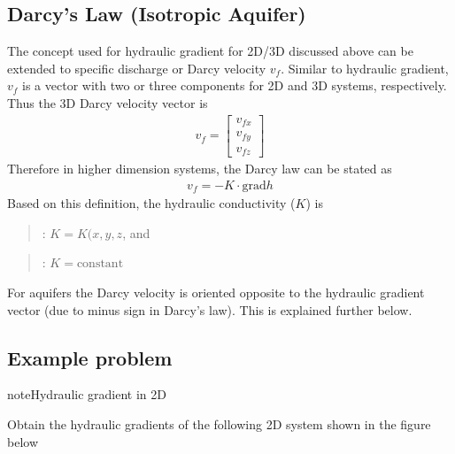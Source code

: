 \documentclass[letterpaper,10pt,english]{jupyterBook}
\begin{document}
\subsection{Darcy’s Law (Isotropic Aquifer)}
\label{\detokenize{content/flow/L6/16_darcy_law_3D:darcy-s-law-isotropic-aquifer}}
\sphinxAtStartPar
The concept used for hydraulic gradient for 2D/3D discussed above can be extended to specific discharge or Darcy velocity \(v_f\). Similar to hydraulic gradient, \(v_f\) is a vector with two or three components for 2D and 3D systems, respectively. Thus the 3D Darcy velocity vector is
\begin{equation*}
\begin{split}
v_f = \begin{bmatrix}
v_{fx}
\\ 
v_{fy}
\\ 
v_{fz}
\end{bmatrix}   
\end{split}
\end{equation*}
\sphinxAtStartPar
Therefore in higher dimension systems, the Darcy law can be stated as
\begin{equation*}
\begin{split}
v_f = - K \cdot \text{grad}h
\end{split}
\end{equation*}
\sphinxAtStartPar
Based on this definition, the hydraulic conductivity (\(K\)) is
\begin{quote}

\sphinxAtStartPar
{}: \(K = K(x,y,z\), and
\end{quote}
\begin{quote}

\sphinxAtStartPar
{}: \(K = \text{constant}\)
\end{quote}

\sphinxAtStartPar
For  aquifers the Darcy velocity is oriented opposite to the hydraulic gradient vector (due to minus sign in Darcy’s law). This is explained further below.


\subsection{Example problem}
\label{\detokenize{content/flow/L6/16_darcy_law_3D:example-problem}}
\begin{sphinxadmonition}{note}{Hydraulic gradient in 2D}

\sphinxAtStartPar
Obtain the hydraulic gradients of the following 2D system shown in the figure below
\end{sphinxadmonition}
\end{document}
